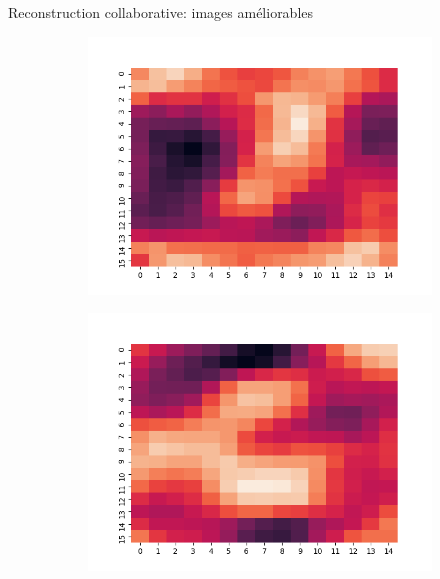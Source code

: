 \documentclass[hyperref={pdfpagelabels=false}]{beamer}
\begin{document}
\begin{frame}{Reconstruction collaborative: images améliorables}
\begin{figure}[h]
\begin{subfigure}[c]{0.18\textwidth}
                \includegraphics[scale=.12]{88}
            \end{subfigure}
            \begin{subfigure}[c]{0.18\textwidth}
                \includegraphics[scale=.12]{99}
            \end{subfigure}
        \end{figure}
    \end{frame}
\end{document}
